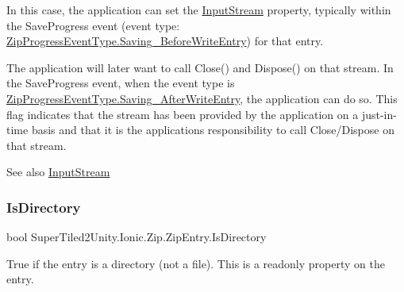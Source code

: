 In this case, the application can set the \mbox{\hyperlink{class_super_tiled2_unity_1_1_ionic_1_1_zip_1_1_zip_entry_a9c5db72a0ee3dad46be934c75ffcfe91}{Input\+Stream}} property, typically within the Save\+Progress event (event type\+: \mbox{\hyperlink{namespace_super_tiled2_unity_1_1_ionic_1_1_zip_a6584db8196e626ddfc455e74d31a841fa6a5772cb33fcfbfbe2f970efdac29ac4}{Zip\+Progress\+Event\+Type.\+Saving\+\_\+\+Before\+Write\+Entry}}) for that entry. 

The application will later want to call Close() and Dispose() on that stream. In the Save\+Progress event, when the event type is \mbox{\hyperlink{namespace_super_tiled2_unity_1_1_ionic_1_1_zip_a6584db8196e626ddfc455e74d31a841fa25e89555bbf919c6e0d8d535bbdfcc67}{Zip\+Progress\+Event\+Type.\+Saving\+\_\+\+After\+Write\+Entry}}, the application can do so. This flag indicates that the stream has been provided by the application on a just-\/in-\/time basis and that it is the application\textquotesingle{}s responsibility to call Close/\+Dispose on that stream. 

\begin{DoxySeeAlso}{See also}
\mbox{\hyperlink{class_super_tiled2_unity_1_1_ionic_1_1_zip_1_1_zip_entry_a9c5db72a0ee3dad46be934c75ffcfe91}{Input\+Stream}}


\end{DoxySeeAlso}
\mbox{\label{class_super_tiled2_unity_1_1_ionic_1_1_zip_1_1_zip_entry_ad15b658412856468c7f75983c6f9de11}} 
\subsubsection{\texorpdfstring{Is\+Directory}{IsDirectory}}
{\footnotesize\ttfamily bool Super\+Tiled2\+Unity.\+Ionic.\+Zip.\+Zip\+Entry.\+Is\+Directory\hspace{0.3cm}{\ttfamily [get]}}



True if the entry is a directory (not a file). This is a readonly property on the entry. 

\mbox{\label{class_super_tiled2_unity_1_1_ionic_1_1_zip_1_1_zip_entry_a04adaebb58e53fedd580cfa10fd1c7a9}} 
